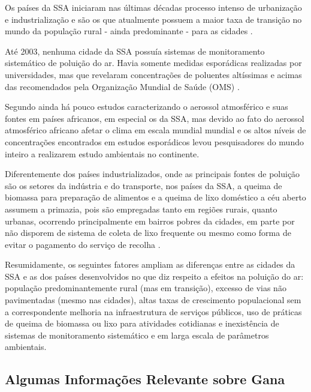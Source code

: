 Os países da SSA iniciaram nas últimas décadas processo intenso de urbanização e
industrialização e são os que atualmente possuem a maior taxa de transição no 
mundo da população rural - ainda predominante - para as cidades 
\citep{MONTGOMERY2008}. 
 
Até 2003, nenhuma cidade da SSA possuía sistemas de monitoramento 
sistemático de poluição do ar. Havia somente medidas esporádicas realizadas
por universidades, mas que revelaram concentrações de poluentes altíssimas e 
acimas das recomendados pela Organização Mundial de Saúde (OMS) 
\citep{EZZATI2004}. 

Segundo \citet{aboh2009} ainda há pouco estudos caracterizando o 
aerossol atmosférico e suas fontes em países africanos, em especial os da SSA, 
mas devido ao fato do aerossol atmosférico africano afetar o clima em escala 
mundial mundial e os altos níveis de concentrações encontrados em estudos 
esporádicos levou pesquisadores do mundo inteiro a realizarem estudo ambientais 
no continente.

Diferentemente dos países industrializados, onde as principais fontes de 
poluição são os setores da indústria e do transporte, nos países da SSA, a 
queima de biomassa para preparação de alimentos e a queima de lixo 
doméstico a céu aberto assumem a primazia, pois são empregadas tanto em 
regiões rurais, quanto urbanas, ocorrendo principalmente em bairros pobres da 
cidades, em parte por não disporem de sistema de coleta de lixo frequente ou 
mesmo como forma de evitar o pagamento do serviço de recolha \citep{SMITH2004}.

Resumidamente, os seguintes fatores ampliam as diferenças entre as cidades da SSA 
e as dos países desenvolvidos no que diz respeito a efeitos na poluição do ar: 
população predominantemente rural (mas em transição), excesso de vias 
não pavimentadas (mesmo nas cidades), altas taxas de crescimento populacional 
sem a correspondente melhoria na infraestrutura de serviços públicos, 
uso de práticas de queima de biomassa ou lixo para atividades cotidianas e
inexistência de sistemas de monitoramento sistemático e em larga escala de 
parâmetros ambientais. 

\subsection{Algumas Informações Relevante sobre Gana}


